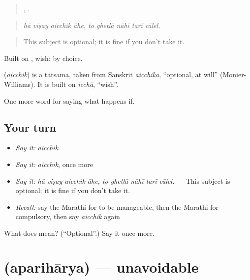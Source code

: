 \begin{quote}
   ,     .
\end{quote}

\begin{quote}
\emph{hā viṣay aicchik āhe, to ghetlā nāhī tarī cālel.}
\end{quote}

\begin{quote}
This subject is optional; it is fine if you don't take it.
\end{quote}

Built on , wish: by choice.

\begin{cousinweb}
\textbf{} (\emph{aicchik}) is a tatsama, taken from Sanskrit \emph{aicchika}, \textquotedblleft{}optional, at will\textquotedblright{} (Monier-Williams). It is built on \emph{icchā}, \textquotedblleft{}wish\textquotedblright{}.
\end{cousinweb}

\begin{grammarlens}[title={What you've built}]
One more word for saying what happens if.
\end{grammarlens}

\subsection*{Your turn}
\begin{itemize}
\raggedright
  \item \emph{Say it:} \emph{aicchik}
  \item \emph{Say it:} \emph{aicchik}, once more
  \item \emph{Say it:} \emph{hā viṣay aicchik āhe, to ghetlā nāhī tarī cālel.} — This subject is optional; it is fine if you don't take it.
  \item \emph{Recall:} say the Marathi for to be manageable, then the Marathi for compulsory, then say \emph{aicchik} again
\end{itemize}

\begin{tcolorbox}[breakable,colback=teal!4,colframe=teal!35!black,title={Before you move on}]
What does  mean? (\textquotedblleft{}Optional\textquotedblright{}.) Say it once more.
\end{tcolorbox}
\section[\texorpdfstring{\mr{अपरिहार्य} (aparihārya)}{अपरिहार्य (aparihārya)}]{ (aparihārya) — unavoidable}

